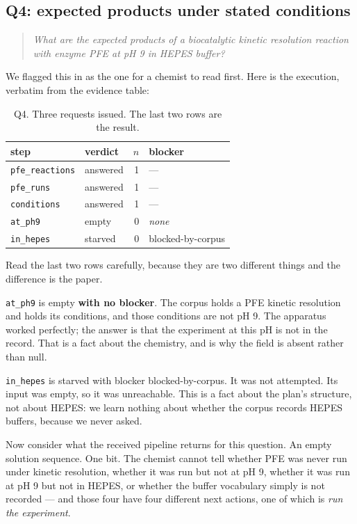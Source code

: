 \documentclass[11pt,a4paper]{article}
\theoremstyle{plain}
\theoremstyle{definition}
\theoremstyle{remark}
\newcommand{\vans}{\textsf{answered}}
\newcommand{\vempty}{\textsf{empty}}
\newcommand{\vstarve}{\textsf{starved}}
\newcommand{\bcorp}{\textsf{blocked-by-corpus}}
\begin{document}
\subsection{Q4: expected products under stated conditions}
\label{sec:q4}

\begin{quote}
\emph{What are the expected products of a biocatalytic kinetic
resolution reaction with enzyme PFE at pH 9 in HEPES buffer?}
\end{quote}

We flagged this in  as the one for a chemist to read
first. Here is the execution, verbatim from the evidence table:

\begin{table}[H]\centering
\begin{tabular}{llrl}
\toprule
step & verdict & $n$ & blocker \\
\midrule
\texttt{pfe\_reactions} & \vans     & 1 & --- \\
\texttt{pfe\_runs}      & \vans     & 1 & --- \\
\texttt{conditions}     & \vans     & 1 & --- \\
\texttt{at\_ph9}        & \vempty   & 0 & \emph{none} \\
\texttt{in\_hepes}      & \vstarve  & 0 & \bcorp \\
\bottomrule
\end{tabular}
\caption{Q4. Three requests issued. The last two rows are the result.}
\label{tab:q4}
\end{table}

Read the last two rows carefully, because they are two different
things and the difference is the paper.

\texttt{at\_ph9} is \vempty{} \textbf{with no blocker}. The corpus
holds a PFE kinetic resolution and holds its conditions, and those
conditions are not pH 9. The apparatus worked perfectly; the answer is
that the experiment at this pH is not in the record. That is a fact
about the chemistry, and  is why the field is
absent rather than null.

\texttt{in\_hepes} is \vstarve{} with blocker \bcorp. It was not
attempted. Its input was empty, so it was unreachable. This is a fact
about the plan's structure, not about HEPES: we learn nothing about
whether the corpus records HEPES buffers, because we never asked.

Now consider what the received pipeline returns for this question. An
empty solution sequence. One bit. The chemist cannot tell whether PFE
was never run under kinetic resolution, whether it was run but not at
pH 9, whether it was run at pH 9 but not in HEPES, or whether the
buffer vocabulary simply is not recorded --- and those four have four
different next actions, one of which is \emph{run the experiment}.
\end{document}
